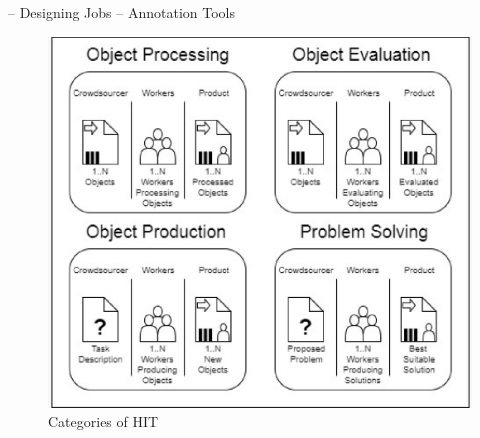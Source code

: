 	-- Designing Jobs
	-- Annotation Tools

\begin{figure}[h]
	\centerline{\includegraphics[scale=0.5] {figure/tasks-categories}}
	\caption{Categories of HIT}
	\label{task-categories}
\end{figure} 